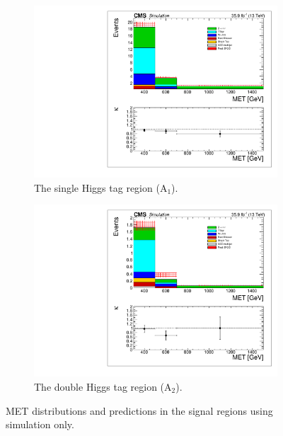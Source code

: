 \begin{figure}[htbp]
\begin{subfigure}[b]{0.5\textwidth}
\centering
\includegraphics[trim={5px 5px 5px 5px},clip,width=\textwidth]{figs/SUS17006/MCclosure_singleHiggsRegionTotal.pdf}
\caption{The single Higgs tag region (A$_{1}$).}
\end{subfigure}
\begin{subfigure}[b]{0.5\textwidth}
\centering
\includegraphics[trim={5px 5px 5px 5px},clip,width=\textwidth]{figs/SUS17006/MCclosure_doubleHiggsRegionTotal.pdf} 
\caption{The double Higgs tag region (A$_{2}$).}
\end{subfigure}
\caption{MET distributions and predictions in the signal regions using simulation only.}
\label{fig:mcclosure}
\end{figure}


